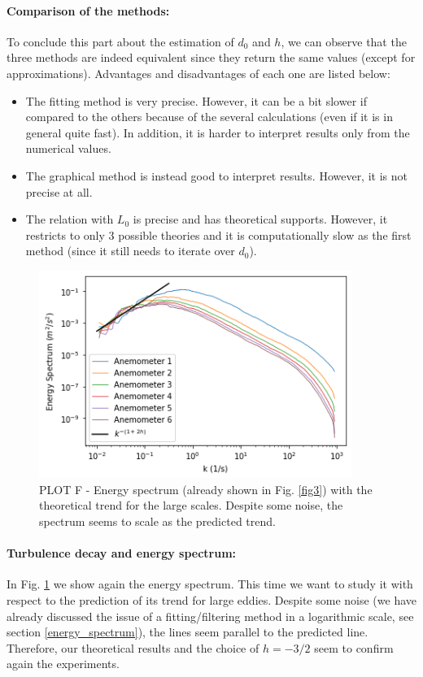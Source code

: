 \documentclass[11pt,titlepage]{article}
\begin{document}
\paragraph{Comparison of the methods:}
To conclude this part about the estimation of $d_0$ and $h$, we can observe that the three methods are indeed equivalent since they return the same values (except for approximations). Advantages and disadvantages of each one are listed below:
\begin{itemize}
	\item The fitting method is very precise. However, it can be a bit slower if compared to the others because of the several calculations (even if it is in general quite fast). In addition, it is harder to interpret results only from the numerical values.
	\item The graphical method is instead good to interpret results. However, it is not precise at all. 
	\item The relation with $L_0$ is precise and has theoretical supports. However, it restricts to only 3 possible theories and it is computationally slow as the first method (since it still needs to iterate over $d_0$).
\end{itemize}

  	\begin{center} 
	\begin{figure} [h]
		\centering
		\includegraphics[width = 4in]{./figures/ex1_5_4.png}
		\caption{PLOT F - Energy spectrum (already shown in Fig. \ref{fig3}) with the theoretical trend for the large scales. Despite some noise, the spectrum seems to scale as the predicted trend.}
		\label{fig8}
	\end{figure}
\end{center}

\paragraph{Turbulence decay and energy spectrum: } 
 In Fig. \ref{fig8} we show again the energy spectrum. This time we want to study it with respect to the prediction of its trend for large eddies. Despite some noise (we have already discussed the issue of a fitting/filtering method in a logarithmic scale, see section \ref{energy_spectrum}), the lines seem parallel to the predicted line. Therefore, our theoretical results and the choice of $h=-3/2$ seem to confirm again the experiments.
\end{document}
